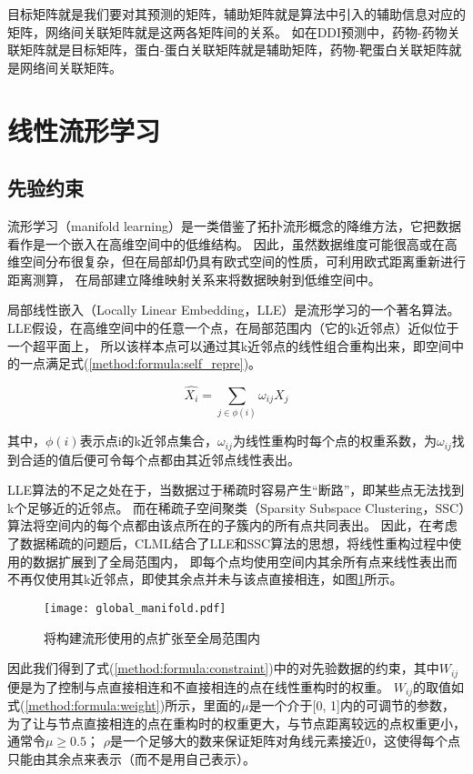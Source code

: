 目标矩阵就是我们要对其预测的矩阵，辅助矩阵就是算法中引入的辅助信息对应的矩阵，网络间关联矩阵就是这两各矩阵间的关系。
如在DDI预测中，药物-药物关联矩阵就是目标矩阵，蛋白-蛋白关联矩阵就是辅助矩阵，药物-靶蛋白关联矩阵就是网络间关联矩阵。


\section{线性流形学习}
\subsection{先验约束}
\label{method:subsec:prior}
流形学习（manifold learning）是一类借鉴了拓扑流形概念的降维方法，它把数据看作是一个嵌入在高维空间中的低维结构。
因此，虽然数据维度可能很高或在高维空间分布很复杂，但在局部却仍具有欧式空间的性质，可利用欧式距离重新进行距离测算，
在局部建立降维映射关系来将数据映射到低维空间中。


局部线性嵌入（Locally Linear Embedding，LLE）是流形学习的一个著名算法。
LLE假设，在高维空间中的任意一个点，在局部范围内（它的k近邻点）近似位于一个超平面上，
所以该样本点可以通过其k近邻点的线性组合重构出来，即空间中的一点满足式(\ref{method:formula:self_repre})。


\begin{equation}
    \hat{X_i}=\sum_{j\in\phi(i)}\omega_{ij}X_j \label{method:formula:self_repre}
\end{equation}

其中，$\phi(i)$表示点i的k近邻点集合，$\omega_{ij}$为线性重构时每个点的权重系数，为$\omega_{ij}$找到合适的值后便可令每个点都由其近邻点线性表出。


LLE算法的不足之处在于，当数据过于稀疏时容易产生“断路”，即某些点无法找到k个足够近的近邻点。
而在稀疏子空间聚类（Sparsity Subspace Clustering，SSC）算法将空间内的每个点都由该点所在的子簇内的所有点共同表出\cite{elhamifar2013sparse}。
因此，在考虑了数据稀疏的问题后，CLML结合了LLE和SSC算法的思想，将线性重构过程中使用的数据扩展到了全局范围内，
即每个点均使用空间内其余所有点来线性表出而不再仅使用其k近邻点，即使其余点并未与该点直接相连，如图\ref{method:fig:global_manifold}所示。

\begin{figure}
    \centering
    \texttt{[image: global\_manifold.pdf]}
    \caption{将构建流形使用的点扩张至全局范围内}
    \label{method:fig:global_manifold}
\end{figure}

因此我们得到了式(\ref{method:formula:constraint})中的对先验数据的约束，其中$W_{ij}$便是为了控制与点直接相连和不直接相连的点在线性重构时的权重。
$W_{ij}$的取值如式(\ref{method:formula:weight})所示，里面的$\mu$是一个介于[0, 1]内的可调节的参数，
为了让与节点直接相连的点在重构时的权重更大，与节点距离较远的点权重更小，通常令$\mu\geq0.5$；
$\rho$是一个足够大的数来保证矩阵对角线元素接近0，这使得每个点只能由其余点来表示（而不是用自己表示）。

